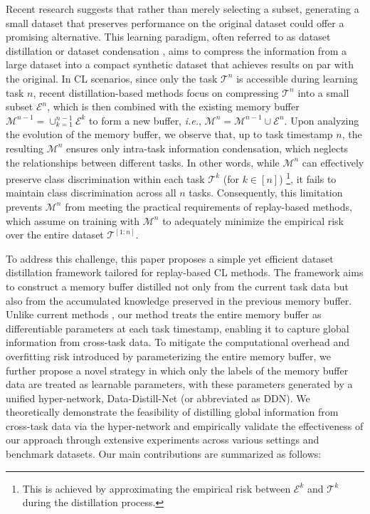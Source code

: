 \documentclass[table, xcdraw]{article}
\theoremstyle{plain}
\theoremstyle{definition}
\theoremstyle{remark}
\begin{document}
Recent research \cite{liu2020mnemonics,LoDM} suggests that rather than merely selecting a subset, generating a small dataset that preserves performance on the original dataset could offer a promising alternative. This learning paradigm, often referred to as dataset distillation or dataset condensation \cite{DDwang2018dataset}, aims to compress the information from a large dataset into a compact synthetic dataset that achieves results on par with the original. In CL scenarios, since only the task $\mathcal T^n$ is accessible during learning task $n$, recent distillation-based methods \cite{liu2020mnemonics,LoDM} focus on compressing $\mathcal T^n$ into a small subset $\mathcal E^n$, which is then combined with the existing memory buffer $\mathcal M^{n-1}=\cup_{k=1}^{n-1} \mathcal E^k$ to form a new buffer, \textit{i.e.}, $\mathcal M^{n}=\mathcal M^{n-1} \cup \mathcal E^n$. Upon analyzing the evolution of the memory buffer, we observe that, up to task timestamp $n$, the resulting $\mathcal M^n$ ensures only intra-task information condensation, which neglects the relationships between different tasks. In other words, while $\mathcal M^n$ can effectively preserve class discrimination within each task $\mathcal{T}^k$ (for $k\in [n]$) \footnote{This is achieved by approximating the empirical risk between $\mathcal{E}^k$ and $\mathcal{T}^k$ during the distillation process.}, it fails to maintain class discrimination across all $n$ tasks. Consequently, this limitation prevents $\mathcal M^n$ from meeting the practical requirements of replay-based methods, which assume on training with \(\mathcal{M}^n\) to adequately minimize the empirical risk over the entire dataset \(\mathcal{T}^{[1:n]}\).

To address this challenge, this paper proposes a simple yet efficient dataset distillation framework tailored for replay-based CL methods. The framework aims to construct a memory buffer distilled not only from the current task data but also from the accumulated knowledge preserved in the previous memory buffer. Unlike current methods \cite{liu2020mnemonics,LoDM}, our method treats the entire memory buffer as differentiable parameters at each task timestamp, enabling it to capture global information from cross-task data. To mitigate the computational overhead and overfitting risk introduced by parameterizing the entire memory buffer, we further propose a novel strategy in which only the labels of the memory buffer data are treated as learnable parameters, with these parameters generated by a unified hyper-network, Data-Distill-Net (or abbreviated as DDN). We theoretically demonstrate the feasibility of distilling global information from cross-task data via the hyper-network and empirically validate the effectiveness of our approach through extensive experiments across various settings and benchmark datasets. Our main contributions are summarized as follows:
\end{document}
